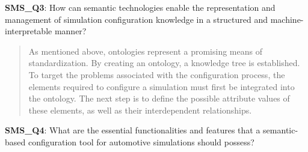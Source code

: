             \textbf{SMS\_Q3}: How can semantic technologies enable the representation and management of simulation configuration knowledge in a structured and machine-interpretable manner?
            \begin{quote}
                As mentioned above, ontologies represent a promising means of standardization. By creating an ontology, a knowledge tree is established. To target the problems associated with the configuration process, the elements required to configure a simulation must first be integrated into the ontology. The next step is to define the possible attribute values of these elements, as well as their interdependent relationships.\\
            \end{quote}

            \textbf{SMS\_Q4}: What are the essential functionalities and features that a semantic-based configuration tool for automotive simulations should possess?
